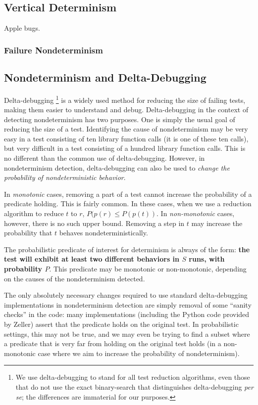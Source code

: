 \subsection{Vertical Determinism}

Apple bugs.

\subsubsection{Failure Nondeterminism}

\subsection{Nondeterminism and Delta-Debugging}

Delta-debugging \cite{DD}\footnote{We use delta-debugging to stand for
  all test reduction algorithms, even those \cite{CReduce,tstl} that do not use the exact
  binary-search that distinguishes delta-debugging \emph{per se}; the
  differences are immaterial for our purposes.}  is a widely used method for reducing the
size of failing tests, making them easier to understand and debug.
Delta-debugging in the context of detecting nondeterminism has two
purposes.  One is simply the usual goal of reducing the size of a
test.  Identifying the cause of nondeterminism may be very easy in a
test consisting of ten library function calls (it is one of these ten
calls), but very difficult in a test consisting of a hundred library
function calls.  This is no different than the common use of
delta-debugging.  However, in nondeterminism detection,
delta-debugging can also be used to \emph{change the probability of
  nondeterministic behavior}.

In \emph{monotonic} cases, removing a part of a test cannot
increase the probability of a predicate holding.  This is fairly
common.  In these cases, when we use a reduction algorithm to reduce $t$
to $r$, $P(p(r) \leq P(p(t))$.  In \emph{non-monotonic} cases,
however, there is no such upper bound.  Removing a step in $t$ may
increase the probability that $t$ behaves nondeterministically.

The probabilistic predicate of interest for determinism is always of
the form:  {\bf the test will exhibit at least two different behaviors in $S$
runs, with probability $P$}.  This predicate may be monotonic or
non-monotonic, depending on the causes of the nondeterminism detected.

The only absolutely necessary changes required to use standard
delta-debugging implementations in nondeterminism detection
are simply removal of some ``sanity checks'' in the code:  many
implementations (including the Python code provided by Zeller) assert
that the predicate holds on the original test.  In probabilistic
settings, this may not be true, and we may even be trying to find a
subset where a predicate that is very far from holding on the original test
holds (in a non-monotonic case where we aim to increase the probability
of nondeterminism).

